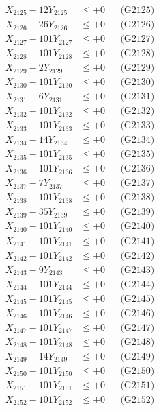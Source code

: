\documentclass[a4paper,10pt]{article}
\begin{document}
{\begin{align}
X_{2125} - 12Y_{2125} &\leq +0 && \text{(G2125)} \\
X_{2126} - 26Y_{2126} &\leq +0 && \text{(G2126)} \\
X_{2127} - 101Y_{2127} &\leq +0 && \text{(G2127)} \\
X_{2128} - 101Y_{2128} &\leq +0 && \text{(G2128)} \\
X_{2129} - 2Y_{2129} &\leq +0 && \text{(G2129)} \\
X_{2130} - 101Y_{2130} &\leq +0 && \text{(G2130)} \\
\allowbreak
X_{2131} - 6Y_{2131} &\leq +0 && \text{(G2131)} \\
X_{2132} - 101Y_{2132} &\leq +0 && \text{(G2132)} \\
X_{2133} - 101Y_{2133} &\leq +0 && \text{(G2133)} \\
X_{2134} - 14Y_{2134} &\leq +0 && \text{(G2134)} \\
X_{2135} - 101Y_{2135} &\leq +0 && \text{(G2135)} \\
X_{2136} - 101Y_{2136} &\leq +0 && \text{(G2136)} \\
X_{2137} - 7Y_{2137} &\leq +0 && \text{(G2137)} \\
X_{2138} - 101Y_{2138} &\leq +0 && \text{(G2138)} \\
X_{2139} - 35Y_{2139} &\leq +0 && \text{(G2139)} \\
X_{2140} - 101Y_{2140} &\leq +0 && \text{(G2140)} \\
\allowbreak
X_{2141} - 101Y_{2141} &\leq +0 && \text{(G2141)} \\
X_{2142} - 101Y_{2142} &\leq +0 && \text{(G2142)} \\
X_{2143} - 9Y_{2143} &\leq +0 && \text{(G2143)} \\
X_{2144} - 101Y_{2144} &\leq +0 && \text{(G2144)} \\
X_{2145} - 101Y_{2145} &\leq +0 && \text{(G2145)} \\
X_{2146} - 101Y_{2146} &\leq +0 && \text{(G2146)} \\
X_{2147} - 101Y_{2147} &\leq +0 && \text{(G2147)} \\
X_{2148} - 101Y_{2148} &\leq +0 && \text{(G2148)} \\
X_{2149} - 14Y_{2149} &\leq +0 && \text{(G2149)} \\
X_{2150} - 101Y_{2150} &\leq +0 && \text{(G2150)} \\
\allowbreak
X_{2151} - 101Y_{2151} &\leq +0 && \text{(G2151)} \\
X_{2152} - 101Y_{2152} &\leq +0 && \text{(G2152)} \\

\end{align}}
\end{document}
